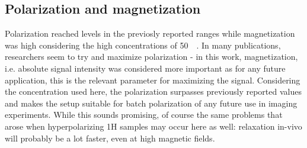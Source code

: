         \subsection{Polarization and magnetization}
            Polarization reached levels in the previosly reported ranges while magnetization was high considering the high concentrations of \SI{50}{\milli\molar}. In many publications, researchers seem to try and maximize polarization - in this work, magnetization, i.e. absolute signal intensity was considered more important as for any future application, this is the relevant parameter for maximizing the signal. Considering the concentration used here, the polarization surpasses previously reported values and makes the setup suitable for batch polarization of any future use in imaging experiments. While this sounds promising, of course the same problems that arose when hyperpolarizing 1H samples may occur here as well: relaxation in-vivo will probably be a lot faster, even at high magnetic fields.
